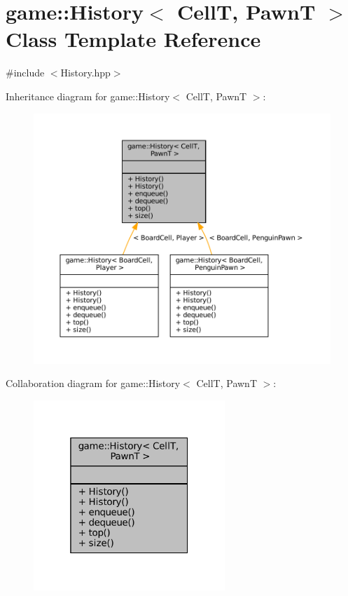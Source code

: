\hypertarget{classgame_1_1_history}{}\section{game\+:\+:History$<$ CellT, PawnT $>$ Class Template Reference}
\label{classgame_1_1_history}


{\ttfamily \#include $<$History.\+hpp$>$}



Inheritance diagram for game\+:\+:History$<$ CellT, PawnT $>$\+:
\nopagebreak
\begin{figure}[H]
\begin{center}
\leavevmode
\includegraphics[width=350pt]{classgame_1_1_history__inherit__graph}
\end{center}
\end{figure}


Collaboration diagram for game\+:\+:History$<$ CellT, PawnT $>$\+:
\nopagebreak
\begin{figure}[H]
\begin{center}
\leavevmode
\includegraphics[width=205pt]{classgame_1_1_history__coll__graph}
\end{center}
\end{figure}
